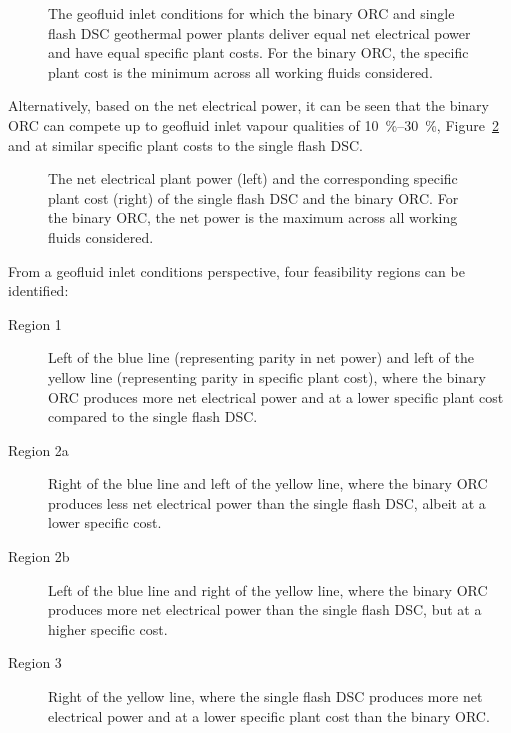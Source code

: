     \begin{figure}[H]
        \centering
        
        \caption[The geofluid inlet conditions for which the binary ORC and single flash \ac{DSC} geothermal power plants deliver equal net electrical power and have equal specific plant costs.]{The geofluid inlet conditions for which the binary ORC and single flash \ac{DSC} geothermal power plants deliver equal net electrical power and have equal specific plant costs. For the binary ORC, the specific plant cost is the minimum across all working fluids considered.}
        \label{fig:prosim_purewater_Breakeven_DSC_vs_ORC_SpecCost_techno}
    \end{figure}

    Alternatively, based on the net electrical power, it can be seen that the binary \ac{ORC} can compete up to geofluid inlet vapour qualities of \qtyrange{10}{30}{\percent}, Figure~\ref{fig:prosim_purewater_Wnet_DSC_vs_ORC_techno} and at similar specific plant costs to the single flash \ac{DSC}. 
    \begin{figure}[H]
        \centering
        
        \caption[The net electrical plant power and the corresponding specific plant cost of the single flash \ac{DSC} and the binary \ac{ORC}.]{The net electrical plant power (left) and the corresponding specific plant cost (right) of the single flash \ac{DSC} and the binary \ac{ORC}. For the binary \ac{ORC}, the net power is the maximum across all working fluids considered.}
        \label{fig:prosim_purewater_Wnet_DSC_vs_ORC_techno}
    \end{figure}

    From a geofluid inlet conditions perspective, four feasibility regions can be identified:
    \begin{description}
       \item[Region 1] Left of the blue line (representing parity in net power) and left of the yellow line (representing parity in specific plant cost), where the binary \ac{ORC} produces more net electrical power and at a lower specific plant cost compared to the single flash \ac{DSC}.
       \item[Region 2a] Right of the blue line and left of the yellow line, where the binary \ac{ORC} produces less net electrical power than the single flash \ac{DSC}, albeit at a lower specific cost.
      \item[Region 2b] Left of the blue line and right of the yellow line, where the binary \ac{ORC} produces more net electrical power than the single flash \ac{DSC}, but at a higher specific cost.
       \item[Region 3] Right of the yellow line, where the single flash \ac{DSC} produces more net electrical power and at a lower specific plant cost than the binary \ac{ORC}.
    \end{description}

